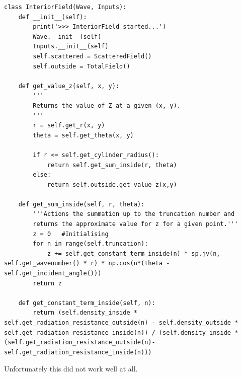 \begin{lstlisting}
class InteriorField(Wave, Inputs):
    def __init__(self):
        print('>>> InteriorField started...')
        Wave.__init__(self)
        Inputs.__init__(self)
        self.scattered = ScatteredField()
        self.outside = TotalField()

    def get_value_z(self, x, y):
        '''
        Returns the value of Z at a given (x, y).
        '''
        r = self.get_r(x, y)
        theta = self.get_theta(x, y)

        if r <= self.get_cylinder_radius():
            return self.get_sum_inside(r, theta)
        else:
            return self.outside.get_value_z(x,y)

    def get_sum_inside(self, r, theta):
        '''Actions the summation up to the truncation number and
        returns the approximate value for z for a given point.'''
        z = 0   #Initialising
        for n in range(self.truncation):
            z += self.get_constant_term_inside(n) * sp.jv(n, self.get_wavenumber() * r) * np.cos(n*(theta - self.get_incident_angle()))
        return z

    def get_constant_term_inside(self, n):
        return (self.density_inside * self.get_radiation_resistance_outside(n) - self.density_outside * self.get_radiation_resistance_inside(n)) / (self.density_inside * (self.get_radiation_resistance_outside(n)- self.get_radiation_resistance_inside(n)))
\end{lstlisting}

Unfortunately this did not work well at all.

